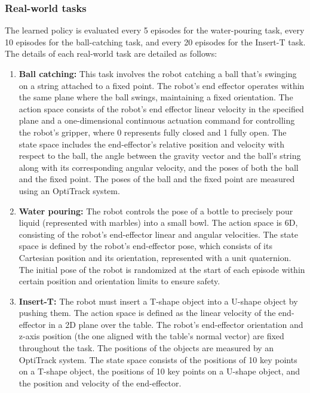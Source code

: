 \subsubsection{Real-world tasks}
\label{appendix:real_robot_experiments_task details}
The learned policy is evaluated every 5 episodes for the water-pouring task, every 10 episodes for the ball-catching task, and every 20 episodes for the Insert-T task. The details of each real-world task are detailed as follows:
\begin{enumerate}[label=\roman*), leftmargin=0.6cm]
  \item \textbf{Ball catching:} This task involves the robot catching a ball that's swinging on a string attached to a fixed point. 
  The robot's end effector operates within the same plane where the ball swings, maintaining a fixed orientation. The {action space} consists of the robot's end effector linear velocity in the specified plane and a one-dimensional continuous actuation command for controlling the robot's gripper, where 0 represents fully closed and 1 fully open. The {state space} includes the end-effector's relative position and velocity with respect to the ball, the angle between the gravity vector and the ball's string along with its corresponding angular velocity, and the poses of both the ball and the fixed point.
  The poses of the ball and the fixed point are measured using an OptiTrack system.

  \item \textbf{Water pouring:} The robot controls the pose of a bottle to precisely pour liquid (represented with marbles) into a small bowl. The {action space} is 6D, consisting of the robot's end-effector linear and angular velocities. The {state space} is defined by the robot's end-effector pose, which consists of its Cartesian position and its orientation, represented with a unit quaternion. The initial pose of the robot is randomized at the start of each episode within certain position and orientation limits to ensure safety.

  \item \textbf{Insert-T:} The robot must insert a T-shape object into a U-shape object by pushing them. 
  The {action space} is defined as the linear velocity of the end-effector in a 2D plane over the table.
  The robot's end-effector orientation and z-axis position (the one aligned with the table's normal vector) are fixed throughout the task.
  The positions of the objects are measured by an OptiTrack system.
  The state space consists of the positions of 10 key points on a T-shape object, the positions of 10 key points on a U-shape object, and the position and velocity of the end-effector.
\end{enumerate}

